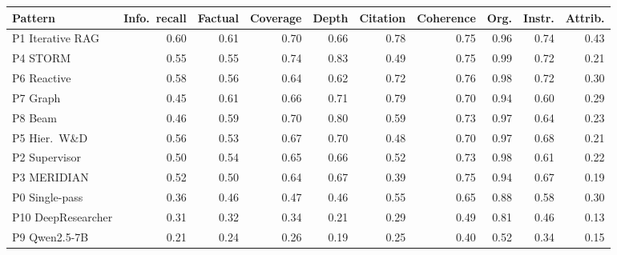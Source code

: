 \begin{tabular}{lrrrrrrrrr}
\toprule
Pattern & Info.\ recall & Factual & Coverage & Depth & Citation & Coherence & Org. & Instr. & Attrib.\\
\midrule
P1 Iterative RAG & 0.60 & 0.61 & 0.70 & 0.66 & 0.78 & 0.75 & 0.96 & 0.74 & 0.43\\
P4 STORM & 0.55 & 0.55 & 0.74 & 0.83 & 0.49 & 0.75 & 0.99 & 0.72 & 0.21\\
P6 Reactive & 0.58 & 0.56 & 0.64 & 0.62 & 0.72 & 0.76 & 0.98 & 0.72 & 0.30\\
P7 Graph & 0.45 & 0.61 & 0.66 & 0.71 & 0.79 & 0.70 & 0.94 & 0.60 & 0.29\\
P8 Beam & 0.46 & 0.59 & 0.70 & 0.80 & 0.59 & 0.73 & 0.97 & 0.64 & 0.23\\
P5 Hier.\ W\&D & 0.56 & 0.53 & 0.67 & 0.70 & 0.48 & 0.70 & 0.97 & 0.68 & 0.21\\
P2 Supervisor & 0.50 & 0.54 & 0.65 & 0.66 & 0.52 & 0.73 & 0.98 & 0.61 & 0.22\\
P3 MERIDIAN & 0.52 & 0.50 & 0.64 & 0.67 & 0.39 & 0.75 & 0.94 & 0.67 & 0.19\\
P0 Single-pass & 0.36 & 0.46 & 0.47 & 0.46 & 0.55 & 0.65 & 0.88 & 0.58 & 0.30\\
P10 DeepResearcher & 0.31 & 0.32 & 0.34 & 0.21 & 0.29 & 0.49 & 0.81 & 0.46 & 0.13\\
P9 Qwen2.5-7B & 0.21 & 0.24 & 0.26 & 0.19 & 0.25 & 0.40 & 0.52 & 0.34 & 0.15\\
\bottomrule
\end{tabular}